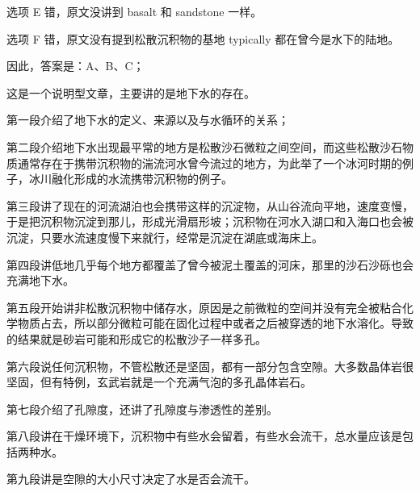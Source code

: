 \begin{blk}
\begin{nlz}
    选项 E 错，原文没讲到 basalt 和 sandstone 一样。

    选项 F 错，原文没有提到松散沉积物的基地 typically 都在曾今是水下的陆地。

    因此，答案是：A、B、C；

    这是一个说明型文章，主要讲的是地下水的存在。

    第一段介绍了地下水的定义、来源以及与水循环的关系；

    第二段介绍地下水出现最平常的地方是松散沙石微粒之间空间，而这些松散沙石物质通常存在于携带沉积物的湍流河水曾今流过的地方，为此举了一个冰河时期的例子，冰川融化形成的水流携带沉积物的例子。

    第三段讲了现在的河流湖泊也会携带这样的沉淀物，从山谷流向平地，速度变慢，于是把沉积物沉淀到那儿，形成光滑扇形坡；沉积物在河水入湖口和入海口也会被沉淀，只要水流速度慢下来就行，经常是沉淀在湖底或海床上。

    第四段讲低地几乎每个地方都覆盖了曾今被泥土覆盖的河床，那里的沙石沙砾也会充满地下水。

    第五段开始讲非松散沉积物中储存水，原因是之前微粒的空间并没有完全被粘合化学物质占去，所以部分微粒可能在固化过程中或者之后被穿透的地下水溶化。导致的结果就是砂岩可能和形成它的松散沙子一样多孔。

    第六段说任何沉积物，不管松散还是坚固，都有一部分包含空隙。大多数晶体岩很坚固，但有特例，玄武岩就是一个充满气泡的多孔晶体岩石。

    第七段介绍了孔隙度，还讲了孔隙度与渗透性的差别。

    第八段讲在干燥环境下，沉积物中有些水会留着，有些水会流干，总水量应该是包括两种水。

    第九段讲是空隙的大小尺寸决定了水是否会流干。
  \end{nlz}
\end{blk}

